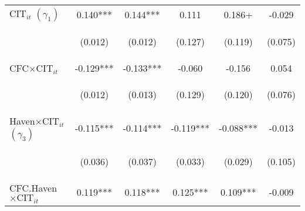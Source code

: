\begin{center}
\begin{tabular}{lccccc}
$ \text{CIT}_{it}$ $(\gamma_1)$ & 0.140*** & 0.144*** & 0.111 & 0.186+ & -0.029 \\
\vspace{4pt} & \begin{footnotesize}(0.012)\end{footnotesize} & \begin{footnotesize}(0.012)\end{footnotesize} & \begin{footnotesize}(0.127)\end{footnotesize} & \begin{footnotesize}(0.119)\end{footnotesize} & \begin{footnotesize}(0.075)\end{footnotesize} \\
CFC$\times\text{CIT}_{it}$ & -0.129*** & -0.133*** & -0.060 & -0.156 & 0.054 \\
\vspace{4pt} & \begin{footnotesize}(0.012)\end{footnotesize} & \begin{footnotesize}(0.013)\end{footnotesize} & \begin{footnotesize}(0.129)\end{footnotesize} & \begin{footnotesize}(0.120)\end{footnotesize} & \begin{footnotesize}(0.076)\end{footnotesize} \\
Haven$\times\text{CIT}_{it}$ $ (\gamma_3)$ & -0.115*** & -0.114*** & -0.119*** & -0.088*** & -0.013 \\
\vspace{4pt} & \begin{footnotesize}(0.036)\end{footnotesize} & \begin{footnotesize}(0.037)\end{footnotesize} & \begin{footnotesize}(0.033)\end{footnotesize} & \begin{footnotesize}(0.029)\end{footnotesize} & \begin{footnotesize}(0.105)\end{footnotesize} \\
CFC.Haven$\times\text{CIT}_{it}$ & 0.119*** & 0.118*** & 0.125*** & 0.109*** & -0.009 \\

\end{tabular}
\end{center}
